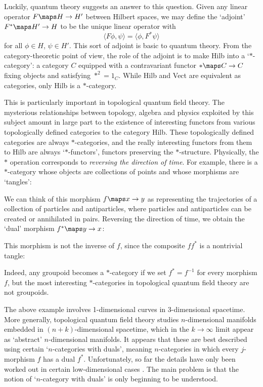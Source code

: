 Luckily, quantum theory suggests an answer to this question.  Given any 
linear operator $F \maps H \to H'$ between Hilbert spaces, we may define the
`adjoint' $F^\ast \maps H' \to H$ to be the unique linear operator with
\[    \langle F\phi,\psi \rangle = \langle \phi,F^\ast \psi\rangle \]
for all $\phi \in H$, $\psi \in H'$.  This sort of adjoint is basic to
quantum theory.  From the category-theoretic point of view, the role of
the adjoint is to make Hilb into a `$\ast$-category': a category $C$
equipped with a contravariant functor $\ast \maps C \to C$ fixing
objects and satisfying $\ast^2 = 1_C$.  While Hilb and Vect are
equivalent as categories, only Hilb is a $\ast$-category.

This is particularly important in topological quantum field theory.  The
mysterious relationships between topology, algebra and physics exploited
by this subject amount in large part to the existence of interesting
functors from various topologically defined categories to the category
Hilb.  These topologically defined categories are always
$\ast$-categories, and the really interesting functors from them to Hilb
are always `$\ast$-functors', functors preserving the $\ast$-structure.
Physically, the $\ast$ operation corresponds to {\it reversing the
direction of time}.   For example, there is a $\ast$-category whose
objects are collections of points and whose morphisms are `tangles':

\medskip
\centerline{\epsfysize=1.5in}
\medskip

\noindent We can think of this morphism $f \maps x \to y$ as
representing the trajectories of a collection of particles and
antiparticles, where particles and antiparticles can be created or
annihilated in pairs.  Reversing the direction of time, we obtain the
`dual' morphism $f^\ast \maps y \to x$:

\medskip
\centerline{\epsfysize=1.5in}
\medskip

\noindent This morphism is not the inverse of $f$, since the composite
$ff^\ast$ is a nontrivial tangle:

\medskip\medskip
\centerline{\epsfysize=3.0in}
\medskip

\noindent Indeed, any groupoid becomes a $\ast$-category if we set
$f^\ast = f^{-1}$ for every morphism $f$, but the most interesting
$\ast$-categories in topological quantum field theory are not groupoids.

The above example involves 1-dimensional curves in 3-dimensional
spacetime.  More generally, topological quantum field theory studies
$n$-dimensional manifolds embedded in $(n+k)$-dimensional spacetime,
which in the $k \to \infty$ limit appear as `abstract' $n$-dimensional
manifolds.   It appears that these are best described using certain
`$n$-categories with duals', meaning $n$-categories in which 
every $j$-morphism $f$ has a dual $f^\ast$.   Unfortunately, so far
the details have only been worked out in certain low-dimensional cases
\cite{B,BL}.  The main problem is that the notion of `$n$-category with
duals' is only beginning to be understood.  

